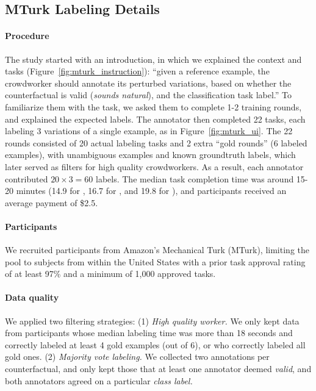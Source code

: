 \subsection{MTurk Labeling Details}
\label{appendix:label_instruct}


\paragraph{Procedure}
The study started with an introduction, in which we explained the context and tasks (Figure~\ref{fig:mturk_instruction}): 
``given a reference example, the crowdworker should annotate its perturbed variations, based on whether the counterfactual is valid (\emph{sounds natural}), and the classification task label.''
To familiarize them with the task, we asked them to complete 1-2 training rounds, and explained the expected labels.
The annotator then completed 22 tasks, each labeling 3 variations of a single example, as in Figure~\ref{fig:mturk_ui}.
The 22 rounds consisted of 20 actual labeling tasks and 2 extra ``gold rounds'' (6 labeled examples), with unambiguous examples and known groundtruth labels, which later served as filters for high quality crowdworkers.
As a result, each annotator contributed $20 \times 3=60$ labels.
The median task completion time was around 15-20 minutes (14.9 for \qqp, 16.7 for \sst, and 19.8 for \nli), and participants received an average payment of \$2.5.

\paragraph{Participants}
We recruited participants from Amazon's Mechanical Turk (MTurk), limiting the pool to subjects from within the United States with a prior task approval rating of at least 97\% and a minimum of 1,000 approved tasks.

\paragraph{Data quality}
We applied two filtering strategies: 
(1) \emph{High quality worker.} 
We only kept data from participants whose median labeling time was more than 18 seconds and correctly labeled at least 4 gold examples (out of 6), or who correctly labeled all gold ones.
(2) \emph{Majority vote labeling.}
We collected two annotations per counterfactual, and only kept those that at least one annotator deemed \emph{valid}, and both annotators agreed on a particular \emph{class label.}

